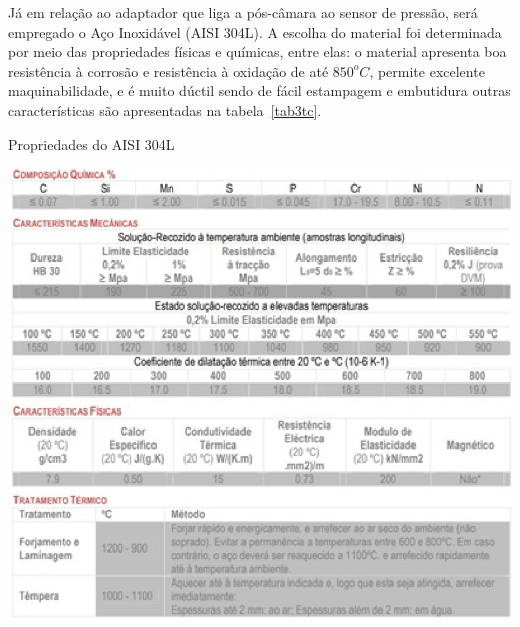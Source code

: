 Já em relação ao adaptador que liga a pós-câmara ao sensor de pressão, será empregado o Aço Inoxidável (AISI 304L). A escolha do material foi determinada por meio das propriedades físicas e químicas, entre elas: o material apresenta boa resistência à corrosão e resistência à oxidação de até $850^oC$, permite excelente maquinabilidade, e é muito dúctil sendo de fácil estampagem e embutidura outras características são apresentadas na tabela~\ref{tab3tc}. 
\begin{table}[!htb]
	\centering
	\caption{Propriedades do AISI 304L}\label{tab3tc}
	\includegraphics[scale=1]{figuras/Figura6tc.eps}
\end{table}
\newpage
